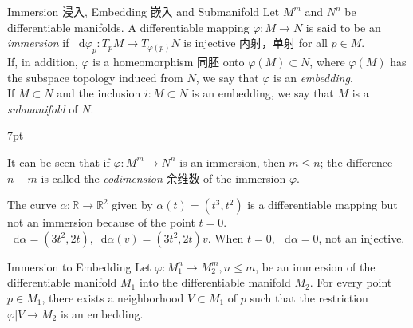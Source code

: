 \documentclass[
	border={25mm 20mm 25mm 30mm},  %
	varwidth,  %
]{standalone}
\newcommand\dd{\mathop{}\!\mathrm{d}}%
\newenvironment{greenformal}{%
\def\FrameCommand{%
\hspace{1pt}%
{\color{greenframeshade}\vrule width 2pt}%
{\color{greenformalshade}\vrule width 4pt}%
\colorbox{greenformalshade}%
}%
\MakeFramed{\advance\hsize-\width\FrameRestore}%
\noindent\hspace{-4.55pt}%
\begin{adjustwidth}{}{7pt}%
\vspace{1pt}\vspace{1pt}%
}
{%
\vspace{5pt}\end{adjustwidth}\endMakeFramed%
}
\begin{document}
\begin{tips}{{Immersion 浸入, Embedding 嵌入 and Submanifold}}
    Let \(M^m\) and \(N^n\) be differentiable manifolds. A differentiable mapping \(\varphi:M\to N\) is said to be an \textsl{immersion} if \(\dd \varphi_p:T_pM\to T_{\varphi(p)}N\) is injective 内射，单射 for all \(p\in M\).
    \\If, in addition, \(\varphi\) is a homeomorphism 同胚 onto \(\varphi(M)\subset N\), where \(\varphi(M)\) has the subspace topology induced from \(N\), we say that \(\varphi\) is an \textsl{embedding}.
    \\If \(M\subset N\) and the inclusion \(i:M\subset N\) is an embedding, we say that \(M\) is a \textsl{submanifold} of \(N\).
\end{tips}

\begin{greenformal}
    It can be seen that if \(\varphi:M^m\to N^n\) is an immersion, then \(m\leqslant n\); the difference \(n-m\) is called the \textsl{codimension} 余维数 of the immersion \(\varphi\).
\end{greenformal}

\begin{tcolorbox}[title = \sffamily{Examples}, colback=Salmon!20, colframe=Salmon!90!Black]
    The curve \(\alpha:\mathbb{R}\to\mathbb{R}^2\) given by \(\alpha(t)=(t^3,t^2)\) is a differentiable mapping but not an immersion because of the point \(t=0\).
    \\\(\dd\alpha=(3t^2,2t),\dd\alpha(v)=(3t^2,2t)v\). When \(t=0\), \(\dd\alpha=0\), not an injective.
\end{tcolorbox}

\begin{tips}{Immersion to Embedding}
    Let \(\varphi:M_1^n\to M_2^m,n\leqslant m\), be an immersion of the differentiable manifold \(M_1\) into the differentiable manifold \(M_2\). For every point \(p\in M_1\), there exists a neighborhood \(V\subset M_1\) of \(p\) such that the restriction \(\varphi|V\to M_2\) is an embedding.
\end{tips}
\end{document}
